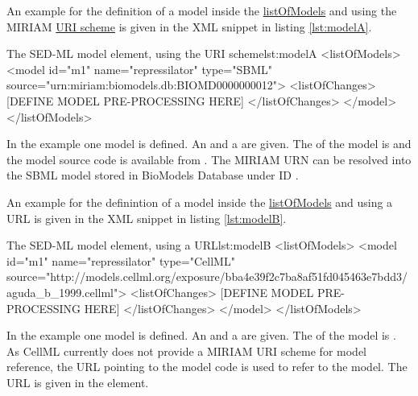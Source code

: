 An example for the definition of a model inside the \hyperref[sec:listOfModels]{listOfModels} and using the MIRIAM \hyperref[sec:uriScheme]{URI scheme} is given in the XML snippet in listing \ref{lst:modelA}.
%
\begin{myXmlLst}{The SED-ML model element, using the URI scheme}{lst:modelA}
<listOfModels>
 <model id="m1" name="repressilator" type="SBML" 
  source="urn:miriam:biomodels.db:BIOMD0000000012">
  <listOfChanges>
   [DEFINE MODEL PRE-PROCESSING HERE]
  </listOfChanges>
 </model>
</listOfModels>
\end{myXmlLst}
%
In the example one model is defined. An  and a  are given. The  of the model is  and the model source code is available from . The MIRIAM URN can be resolved into the SBML model stored in BioModels Database under ID .

An example for the definintion of a model inside the \hyperref[sec:listOfModels]{listOfModels} and using a URL is given in the XML snippet in listing \ref{lst:modelB}.
%
\begin{myXmlLst}{The SED-ML model element, using a URL}{lst:modelB}
<listOfModels>
 <model id="m1" name="repressilator" type="CellML" 
  source="http://models.cellml.org/exposure/bba4e39f2c7ba8af51fd045463e7bdd3/aguda_b_1999.cellml">
  <listOfChanges>
   [DEFINE MODEL PRE-PROCESSING HERE]
  </listOfChanges>
 </model>
</listOfModels>
\end{myXmlLst}
%
In the example one model is defined. An  and a  are given. The  of the model is . As CellML currently does not provide a MIRIAM URI scheme for model reference, the URL pointing to the model code is used to refer to the model. The URL is given in the  element.


